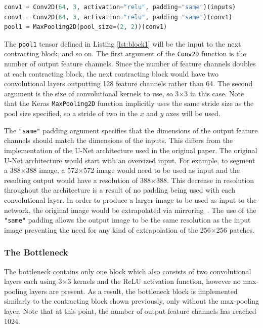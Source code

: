\begin{lstlisting}[float={!t},caption={The implementation of the first contracting block of the U-Net architecture using the Keras functional API.},label={lst:block1},language=Python,upquote=true,belowskip=0pt]
conv1 = Conv2D(64, 3, activation="relu", padding="same")(inputs)
conv1 = Conv2D(64, 3, activation="relu", padding="same")(conv1)
pool1 = MaxPooling2D(pool_size=(2, 2))(conv1)
\end{lstlisting}
The \texttt{pool1} tensor defined in Listing \ref{lst:block1} will be the input to the next contracting block, and so on. The first argument of the \texttt{Conv2D} function is the number of output feature channels. Since the number of feature channels doubles at each contracting block, the next contracting block would have two convolutional layers outputting 128 feature channels rather than 64. The second argument is the size of convolutional kernels to use, so 3$\times$3 in this case. Note that the Keras \texttt{MaxPooling2D} function implicitly uses the same stride size as the pool size specified, so a stride of two in the $x$ and $y$ axes will be used.

The \texttt{"{}same"{}} padding argument specifies that the dimensions of the output feature channels should match the dimensions of the inputs. This differs from the implementation of the U-Net architecture used in the original paper. The original U-Net architecture would start with an oversized input. For example, to segment a 388$\times$388 image, a 572$\times$572 image would need to be used as input and the resulting output would have a resolution of 388$\times$388. This decrease in resolution throughout the architecture is a result of no padding being used with each convolutional layer. In order to produce a larger image to be used as input to the network, the original image would be extrapolated via mirroring~\cite{ronneberger2015u}. The use of the \texttt{"{}same"{}} padding allows the output image to be the same resolution as the input image preventing the need for any kind of extrapolation of the 256$\times$256 patches.

\subsubsection{The Bottleneck}

The bottleneck contains only one block which also consists of two convolutional layers each using 3$\times$3 kernels and the ReLU activation function, however no max-pooling layers are present. As a result, the bottleneck block is implemented similarly to the contracting block shown previously, only without the max-pooling layer. Note that at this point, the number of output feature channels has reached 1024.

